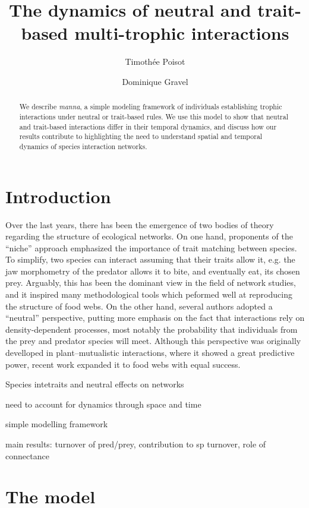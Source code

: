 \documentclass[10pt,twocolumn,fleqn]{article}
\title{The dynamics of neutral and trait-based multi-trophic interactions}
\date{}
\author[1,2]{Timoth\'ee Poisot}
\author[1,2]{Dominique Gravel}
\affil[1]{Universit\'e du Qu\'ebec \`a Rimouski, Rimouski, Canada.}
\affil[2]{Quebec Center for Biodiversity Science, McGill University, Montr\'eal, Canada.}
\affil[*]{email: \texttt{timothee.poisot@uqar.ca}}
\begin{document}
\maketitle

\begin{abstract}
We describe \emph{manna}, a simple modeling framework of individuals
establishing trophic interactions under neutral or trait-based rules. We use
this model to show that neutral and trait-based interactions differ in their
temporal dynamics, and discuss how our results contribute to highlighting the
need to understand spatial and temporal dynamics of species interaction
networks.
\end{abstract}

\section{Introduction}

Over the last years, there has been the emergence of two bodies of theory
regarding the structure of ecological networks. On one hand, proponents of the
``niche'' approach emphasized the importance of trait matching between species.
To simplify, two species can interact assuming that their traits allow it, e.g.
the jaw morphometry of the predator allows it to bite, and eventually eat,
its chosen prey. Arguably, this has been the dominant view in the field of
network studies, and it inspired many methodological tools which peformed well
at reproducing the structure of food webs. On the other hand, several authors
adopted a ``neutral'' perspective, putting more emphasis on the fact that
interactions rely on density-dependent processes, most notably the probability
that individuals from the prey and predator species will meet. Although this
perspective was originally develloped in plant--mutualistic interactions, where
it showed a great predictive power, recent work expanded it to food webs with
equal success.

Species intetraits and neutral effects on networks

need to account for dynamics through space and time

simple modelling framework

main results: turnover of pred/prey, contribution to sp turnover, role of connectance

\section{The model}
\end{document}
